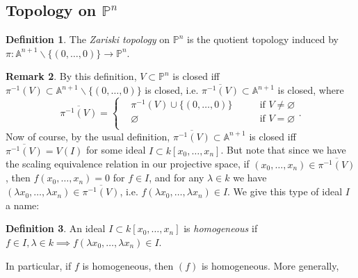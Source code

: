 \documentclass{article}
\newcommand{\A}{\mathbb{A}}
\newcommand{\p}{\mathbb{P}}
\theoremstyle{definition}
\newtheorem{defn}{Definition}[subsection]
\newtheorem{remark}[defn]{Remark}
\begin{document}
\subsection{Topology on $\p^n$}

\begin{defn}
The \textit{Zariski topology} on $\p^n$ is the quotient topology induced by $\pi:\A^{n+1}\backslash\{(0,\ldots,0)\}\rightarrow\p^n$. 
\end{defn}

\begin{remark}
By this definition, $V\subset\p^n$ is closed iff $\pi^{-1}(V)\subset\A^{n+1}\backslash\{(0,\ldots,0)\}$ is closed, i.e. $\overline{\pi^{-1}(V)}\subset\A^{n+1}$ is closed, where
\[
\overline{\pi^{-1}(V)}=\left\{
\begin{aligned}
&\pi^{-1}(V)\cup\{(0,\ldots,0)\}\qquad&\text{if }V\neq\varnothing \\
&\varnothing\qquad&\text{if }V=\varnothing \\
\end{aligned}
\right. .
\]
Now of course, by the usual definition, $\overline{\pi^{-1}(V)}\subset\A^{n+1}$ is closed iff $\overline{\pi^{-1}(V)}=V(I)$ for some ideal $I\subset k[x_0,\ldots,x_n]$. But note that since we have the scaling equivalence relation in our projective space, if $(x_0,\ldots,x_n)\in\overline{\pi^{-1}(V)}$, then $f(x_0,\ldots,x_n)=0$ for $f\in I$, and for any $\lambda\in k$ we have $(\lambda x_0,\ldots,\lambda x_n)\in\overline{\pi^{-1}(V)}$, i.e. $f(\lambda x_0,\ldots,\lambda x_n)\in I$. We give this type of ideal $I$ a name:
\end{remark}

\begin{defn}
An ideal $I\subset k[x_0,\ldots,x_n]$ is \textit{homogeneous} if $f\in I,\lambda\in k\implies f(\lambda x_0,\ldots,\lambda x_n)\in I$.
\end{defn}
In particular, if $f$ is homogeneous, then $(f)$ is homogeneous. More generally,
\end{document}
